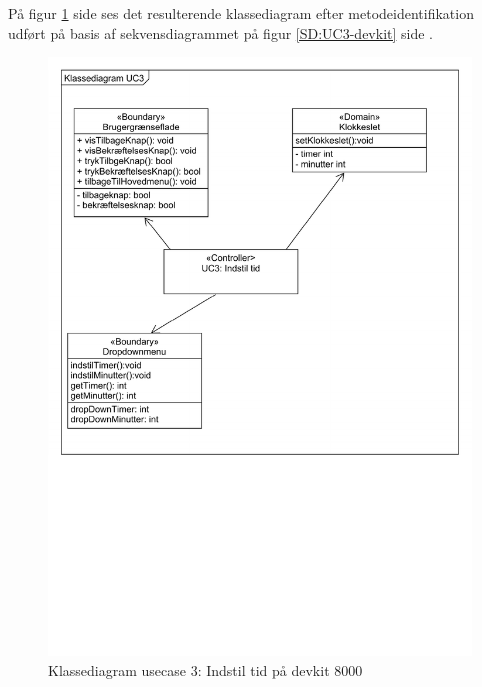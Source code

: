 På figur \ref{CD:UC3-devkit} side \pageref{CD:UC3-devkit} ses det resulterende klassediagram efter metodeidentifikation udført på basis af sekvensdiagrammet på figur \ref{SD:UC3-devkit} side \pageref{SD:UC3-devkit}.
\begin{figure}[H]
	\caption{Klassediagram usecase 3: Indstil tid på devkit 8000}
	\label{CD:UC3-devkit}
	\includegraphics[scale=0.6,trim=10 800 100 0]{Applikationsmodel_UC3/Klassediagram_UC3.pdf}
\end{figure}
